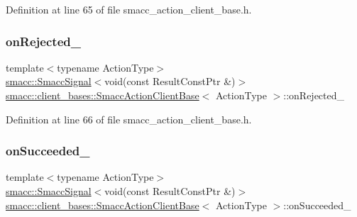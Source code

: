 Definition at line 65 of file smacc\+\_\+action\+\_\+client\+\_\+base.\+h.

\mbox{\label{classsmacc_1_1client__bases_1_1SmaccActionClientBase_a4c878cbf2684701323e2b36668f7d721}} 
\subsubsection{\texorpdfstring{on\+Rejected\+\_\+}{onRejected\_}}
{\footnotesize\ttfamily template$<$typename Action\+Type$>$ \\
\hyperlink{classsmacc_1_1SmaccSignal}{smacc\+::\+Smacc\+Signal}$<$void(const Result\+Const\+Ptr \&)$>$ \hyperlink{classsmacc_1_1client__bases_1_1SmaccActionClientBase}{smacc\+::client\+\_\+bases\+::\+Smacc\+Action\+Client\+Base}$<$ Action\+Type $>$\+::on\+Rejected\+\_\+}



Definition at line 66 of file smacc\+\_\+action\+\_\+client\+\_\+base.\+h.

\mbox{\label{classsmacc_1_1client__bases_1_1SmaccActionClientBase_afa1d615e16c9e825d815a3a3ccaa61df}} 
\subsubsection{\texorpdfstring{on\+Succeeded\+\_\+}{onSucceeded\_}}
{\footnotesize\ttfamily template$<$typename Action\+Type$>$ \\
\hyperlink{classsmacc_1_1SmaccSignal}{smacc\+::\+Smacc\+Signal}$<$void(const Result\+Const\+Ptr \&)$>$ \hyperlink{classsmacc_1_1client__bases_1_1SmaccActionClientBase}{smacc\+::client\+\_\+bases\+::\+Smacc\+Action\+Client\+Base}$<$ Action\+Type $>$\+::on\+Succeeded\+\_\+}



